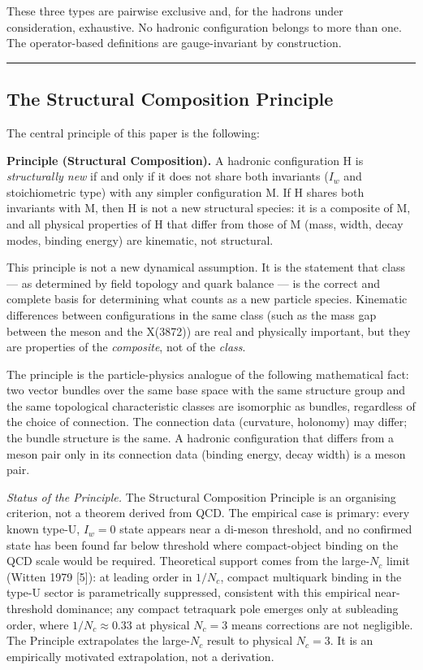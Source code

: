 \documentclass[12pt,a4paper]{article}
\begin{document}
These three types are pairwise exclusive and, for the hadrons under
consideration, exhaustive. No hadronic configuration belongs to more
than one. The operator-based definitions are gauge-invariant by
construction.

\begin{center}\rule{0.5\linewidth}{0.5pt}\end{center}

\hypertarget{the-structural-composition-principle}{%
\subsection{The Structural Composition
Principle}\label{the-structural-composition-principle}}

The central principle of this paper is the following:

\textbf{Principle (Structural Composition).} A hadronic configuration H
is \emph{structurally new} if and only if it does not share both
invariants (\(I_w\) and stoichiometric type) with any simpler
configuration M. If H shares both invariants with M, then H is not a new
structural species: it is a composite of M, and all physical properties
of H that differ from those of M (mass, width, decay modes, binding
energy) are kinematic, not structural.

This principle is not a new dynamical assumption. It is the statement
that class --- as determined by field topology and quark
balance --- is the correct and complete basis for determining what
counts as a new particle species. Kinematic differences between
configurations in the same class (such as the mass gap
between the meson and the X(3872)) are real and physically important,
but they are properties of the \emph{composite}, not of the
\emph{class}.

The principle is the particle-physics analogue of the following
mathematical fact: two vector bundles over the same base space with the
same structure group and the same topological characteristic classes are
isomorphic as bundles, regardless of the choice of connection. The
connection data (curvature, holonomy) may differ; the bundle structure
is the same. A hadronic configuration that differs from a meson pair
only in its connection data (binding energy, decay width) is a meson
pair.

\emph{Status of the Principle.} The Structural Composition Principle is
an organising criterion, not a theorem derived from QCD. The empirical
case is primary: every known type-U, \(I_w = 0\) state appears near a
di-meson threshold, and no confirmed state has been found far below
threshold where compact-object binding on the QCD scale would be
required. Theoretical support comes from the large-\(N_c\) limit (Witten
1979 {[}5{]}): at leading order in \(1/N_c\), compact multiquark binding
in the type-U sector is parametrically suppressed, consistent with this
empirical near-threshold dominance; any compact tetraquark pole emerges
only at subleading order, where \(1/N_c \approx 0.33\) at physical
\(N_c = 3\) means corrections are not negligible. The Principle
extrapolates the large-\(N_c\) result to physical \(N_c = 3\). It is an
empirically motivated extrapolation, not a derivation.
\end{document}
